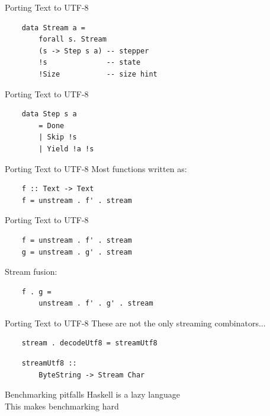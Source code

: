 \documentclass[20pt]{beamer}
\newcommand{\vspaced}{
    \vspace{5mm}
}
\begin{document}
\begin{frame}[fragile]{Porting Text to UTF-8}
    \begin{lstlisting}
    data Stream a =
        forall s. Stream
        (s -> Step s a) -- stepper
        !s              -- state
        !Size           -- size hint
    \end{lstlisting}
\end{frame}

\begin{frame}[fragile]{Porting Text to UTF-8}
    \begin{lstlisting}
    data Step s a
        = Done
        | Skip !s
        | Yield !a !s
    \end{lstlisting}
\end{frame}

\begin{frame}[fragile]{Porting Text to UTF-8}
    Most functions written as:
    \vspaced
    \begin{lstlisting}
    f :: Text -> Text
    f = unstream . f' . stream
    \end{lstlisting}
\end{frame}

\begin{frame}[fragile]{Porting Text to UTF-8}
    \begin{lstlisting}
    f = unstream . f' . stream
    g = unstream . g' . stream
    \end{lstlisting}
    \vspaced
    Stream fusion: \\
    \begin{lstlisting}
    f . g =
        unstream . f' . g' . stream
    \end{lstlisting}
\end{frame}

\begin{frame}[fragile]{Porting Text to UTF-8}
    These are not the only streaming combinators...
    \vspaced
    \begin{lstlisting}
    stream . decodeUtf8 = streamUtf8
    \end{lstlisting}
    \vspaced
    \begin{lstlisting}
    streamUtf8 ::
        ByteString -> Stream Char
    \end{lstlisting}
\end{frame}


\begin{frame}{Benchmarking pitfalls}
    Haskell is a lazy language \\
    This makes benchmarking hard
\end{frame}
\end{document}
